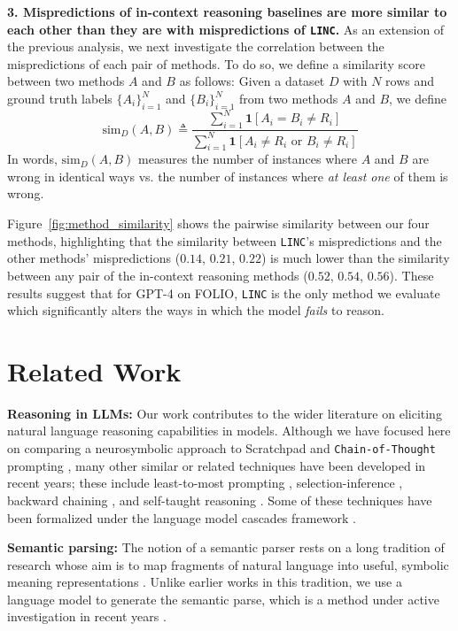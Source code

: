 \documentclass[11pt]{article}
\begin{document}
\textbf{3. Mispredictions of in-context reasoning baselines are more similar to each other than they are with mispredictions of \texttt{LINC}.} As an extension of the previous analysis, we next investigate the correlation between the mispredictions of each pair of methods.
To do so, we define a similarity score between two methods $A$ and $B$ as follows:
Given a dataset $D$ with $N$ rows and ground truth labels $\{A_i\}_{i=1}^N$ and $\{B_i\}_{i=1}^N$ from two methods $A$ and $B$, we define
$$\text{sim}_D(A, B) \triangleq \frac{\sum_{i=1}^N \mathbf{1}\left[ A_i = B_i \ne R_i \right] }{\sum_{i=1}^N \mathbf{1}\left[ A_i \ne R_i \text{ or } B_i \ne R_i\right]}$$
In words, $\text{sim}_D(A,B)$ measures the number of instances where $A$ and $B$ are wrong in identical ways vs. the number of instances where \emph{at least one} of them is wrong.

Figure~\ref{fig:method_similarity} shows the pairwise similarity between our four methods, highlighting that the similarity between \texttt{LINC}'s mispredictions and the other methods' mispredictions ($0.14$, $0.21$, $0.22$) is much lower than the similarity between any pair of the in-context reasoning methods ($0.52$, $0.54$, $0.56$). 
These results suggest that for GPT-4 on FOLIO, \texttt{LINC} is the only method we evaluate which significantly alters the ways in which the model \emph{fails} to reason. 

\section{Related Work} \label{sec:related_work}

\textbf{Reasoning in LLMs:} Our work contributes to the wider literature on eliciting natural language reasoning capabilities in models.
Although we have focused here on comparing a neurosymbolic approach to Scratchpad \cite{nye2021show} and \texttt{Chain-of-Thought} prompting \cite{wei2022chain, kojima2022large, wang2023self}, many other similar or related techniques have been developed in recent years; these include least-to-most prompting \cite{zhou2023least}, selection-inference \cite{creswell2023selection}, backward chaining \cite{tafjord2022entailer, kazemi2023lambada}, and self-taught reasoning \cite{zelikman2022star}.
Some of these techniques have been formalized under the language model cascades framework \cite{dohan2022language}.

\textbf{Semantic parsing:} The notion of a semantic parser rests on a long tradition of research \cite{kamath2019survey} whose aim is to map fragments of natural language into useful, symbolic meaning representations \cite{zelle1996learning, zettlemoyer2005learning, berant2013semantic, liang2013learning, wong2023word}. Unlike earlier works in this tradition, we use a language model to generate the semantic parse, which is a method under active investigation in recent years \citep{shin2022few, drozdov2022compositional, lu2022parsing, wang2023grammar}.
\end{document}
